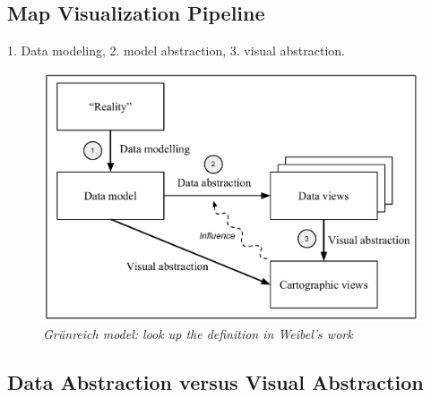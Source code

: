 \documentclass[11pt, oneside]{report}
\begin{document}

\subsection{Map Visualization Pipeline}

1. Data modeling,
2. model abstraction,
3. visual abstraction.

\begin{figure}[htbp]
\begin{center}
\includegraphics[scale=.4]{figs-thesis/map-visualization-pipeline.pdf}
\caption{\emph{Gr{\"u}nreich model: look up the definition in Weibel's work}}
\label{fig:state:of:the:art:gruenreich}
\end{center}
\vspace*{-4ex}
\end{figure}

\subsection{Data Abstraction versus Visual Abstraction}
\end{document}
